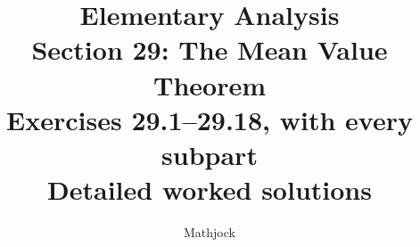 
\title{\textbf{Elementary Analysis}\\[0.3em]
Section 29: The Mean Value Theorem\\[0.4em]
\large Exercises 29.1--29.18, with every subpart\\
Detailed worked solutions}
\author{Mathjock}
\date{}

\maketitle
\bookinfo
\tableofcontents
\clearpage
\setcounter{section}{28}


